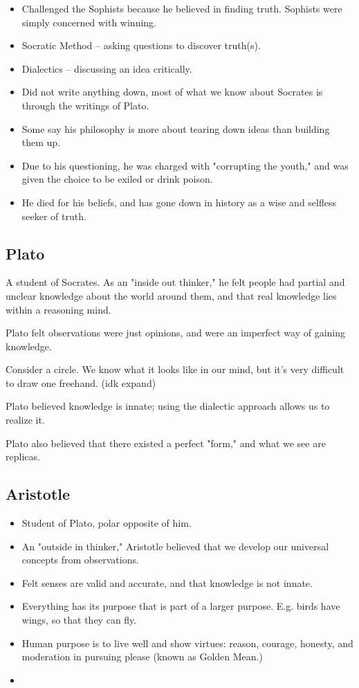 \begin{itemize}
    \item Challenged the Sophists because he believed in finding truth. Sophists were simply concerned with winning.
    \item Socratic Method -- asking questions to discover truth(s).
    \item Dialectics -- discussing an idea critically.
    \item Did not write anything down, most of what we know about Socrates is through the writings of Plato.
    \item Some say his philosophy is more about tearing down ideas than building them up.
    \item Due to his questioning, he was charged with "corrupting the youth," and was given the choice to be exiled or drink poison.
    \item He died for his beliefs, and has gone down in history as a wise and selfless seeker of truth.
\end{itemize}

\subsection{Plato}

A student of Socrates. As an "inside out thinker," he felt people had partial and unclear 
knowledge about the world around them, and that real knowledge lies within a reasoning mind. 

Plato felt observations were just opinions, and were an imperfect way of gaining knowledge.

Consider a circle. We know what it looks like in our mind, but it's very difficult to draw one freehand.
(idk expand)

Plato believed knowledge is innate; using the dialectic approach allows us to realize it. 

Plato also believed that there existed a perfect "form," and what we see are replicas.

\subsection{Aristotle}
\begin{itemize}
    \item Student of Plato, polar opposite of him.
    \item An "outside in thinker," Aristotle believed that we develop our universal concepts from observations.
    \item Felt senses are valid and accurate, and that knowledge is not innate.
    \item Everything has its purpose that is part of a larger purpose. E.g. birds have wings, so that they can fly.
    \item Human purpose is to live well and show virtues: reason, courage, honesty, and moderation in pursuing please (known as Golden Mean.)
    \item 
\end{itemize}
